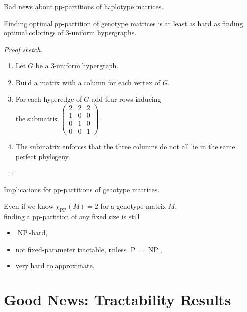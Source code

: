 \documentclass[aspectratio=1610]{beamer}
\begin{document}
\begin{frame}{Bad news about pp-partitions of haplotype matrices.}
  \begin{theorem}
    Finding \alert{optimal pp-partition of genotype matrices}
    is at least as hard as finding \alert{optimal colorings of
      3-uniform hypergraphs}. 
  \end{theorem}

  \begin{proof}[Proof sketch]
    \begin{enumerate}
    \item Let $G$ be a 3-uniform hypergraph.
    \item Build a matrix with a column for each vertex of $G$.
    \item For each hyperedge of $G$ add four rows inducing\\ the submatrix
      $\left(
        \begin{smallmatrix}
          2 & 2 & 2 \\
          1 & 0 & 0 \\
          0 & 1 & 0 \\
          0 & 0 & 1
        \end{smallmatrix}\right)
      $.
    \item The submatrix enforces that the three columns do not all lie
      in the same perfect phylogeny. \qedhere
    \end{enumerate}
  \end{proof}
\end{frame}

\begin{frame}{Implications for pp-partitions of genotype matrices.}
  \begin{corollary}
    Even if we know $\chi_{\operatorname{PP}}(M) = 2$ for a genotype matrix $M$,\\
    finding a pp-partition of any fixed size is still
    \begin{itemize}
    \item $\operatorname{NP}$-hard,
    \item not fixed-parameter tractable, unless
      $\operatorname{P}=\operatorname{NP}$, 
    \item very hard to approximate.
    \end{itemize}
  \end{corollary}
\end{frame}


\section{Good News: Tractability Results}
\end{document}
